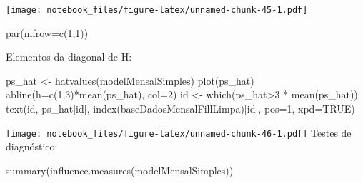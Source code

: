 \documentclass[
]{article}
\newenvironment{Shaded}{\begin{snugshade}}{\end{snugshade}}
\newcommand{\AttributeTok}[1]{\textcolor[rgb]{0.77,0.63,0.00}{#1}}
\newcommand{\ConstantTok}[1]{\textcolor[rgb]{0.00,0.00,0.00}{#1}}
\newcommand{\DecValTok}[1]{\textcolor[rgb]{0.00,0.00,0.81}{#1}}
\newcommand{\FunctionTok}[1]{\textcolor[rgb]{0.00,0.00,0.00}{#1}}
\newcommand{\NormalTok}[1]{#1}
\newcommand{\OtherTok}[1]{\textcolor[rgb]{0.56,0.35,0.01}{#1}}
\newcommand{\SpecialCharTok}[1]{\textcolor[rgb]{0.00,0.00,0.00}{#1}}
\begin{document}
\texttt{[image: notebook\_files/figure-latex/unnamed-chunk-45-1.pdf]}

\begin{Shaded}
\begin{Highlighting}[]
\FunctionTok{par}\NormalTok{(}\AttributeTok{mfrow=}\FunctionTok{c}\NormalTok{(}\DecValTok{1}\NormalTok{,}\DecValTok{1}\NormalTok{))}
\end{Highlighting}
\end{Shaded}

Elementos da diagonal de H:

\begin{Shaded}
\begin{Highlighting}[]
\NormalTok{ps\_hat }\OtherTok{\textless{}{-}} \FunctionTok{hatvalues}\NormalTok{(modelMensalSimples)}
\FunctionTok{plot}\NormalTok{(ps\_hat)}
\FunctionTok{abline}\NormalTok{(}\AttributeTok{h=}\FunctionTok{c}\NormalTok{(}\DecValTok{1}\NormalTok{,}\DecValTok{3}\NormalTok{)}\SpecialCharTok{*}\FunctionTok{mean}\NormalTok{(ps\_hat), }\AttributeTok{col=}\DecValTok{2}\NormalTok{)}
\NormalTok{id }\OtherTok{\textless{}{-}} \FunctionTok{which}\NormalTok{(ps\_hat}\SpecialCharTok{\textgreater{}}\DecValTok{3} \SpecialCharTok{*} \FunctionTok{mean}\NormalTok{(ps\_hat))}
\FunctionTok{text}\NormalTok{(id, ps\_hat[id], }\FunctionTok{index}\NormalTok{(baseDadosMensalFillLimpa)[id], }\AttributeTok{pos=}\DecValTok{1}\NormalTok{, }\AttributeTok{xpd=}\ConstantTok{TRUE}\NormalTok{)}
\end{Highlighting}
\end{Shaded}

\texttt{[image: notebook\_files/figure-latex/unnamed-chunk-46-1.pdf]}
Testes de diagnóstico:

\begin{Shaded}
\begin{Highlighting}[]
\FunctionTok{summary}\NormalTok{(}\FunctionTok{influence.measures}\NormalTok{(modelMensalSimples))}
\end{Highlighting}
\end{Shaded}
\end{document}
